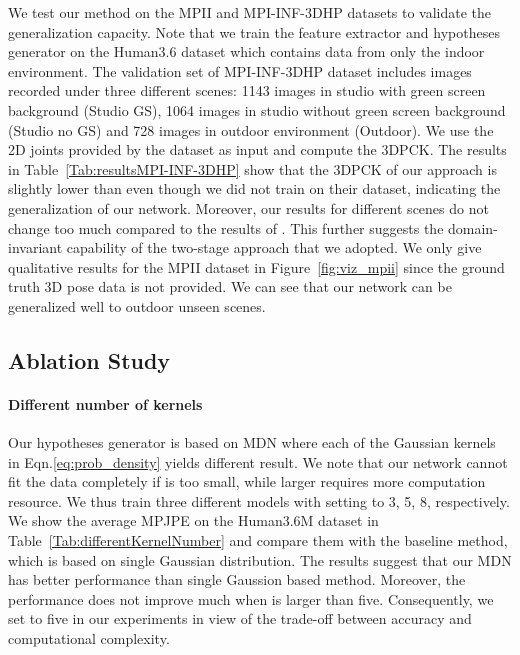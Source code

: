 \documentclass[10pt,twocolumn,letterpaper]{article}
\begin{document}
We test our method on the MPII and MPI-INF-3DHP datasets to validate the generalization capacity. Note that we train the feature extractor and hypotheses generator on the Human3.6 dataset which contains data from only the indoor environment. The validation set of MPI-INF-3DHP dataset includes images recorded under three different scenes: 1143 images in studio with green screen background (Studio GS), 1064 images in studio without green screen background (Studio no GS) and 728 images in outdoor environment (Outdoor). We use the 2D joints provided by the dataset as input and compute the 3DPCK. The results in Table~\ref{Tab:resultsMPI-INF-3DHP} show that the 3DPCK of our approach is slightly lower than \cite{mehta2017monocular} even though we did not train on their dataset, indicating the generalization of our network. Moreover, our results for different scenes do not change too much compared to the results of \cite{mehta2017monocular}. This further suggests the domain-invariant capability of the two-stage approach that we adopted. We only give qualitative results for the MPII dataset in Figure~\ref{fig:viz_mpii} since the ground truth 3D pose data is not provided. We can see that our network can be generalized well to outdoor unseen scenes.


\subsection{Ablation Study}
\paragraph{Different number of kernels} Our hypotheses generator is based on MDN where each of the  Gaussian kernels in Eqn.\eqref{eq:prob_density} yields different result. We note that our network cannot fit the data completely if  is too small, while larger  requires more computation resource. We thus train three different models with  setting to 3, 5, 8, respectively. We show the average MPJPE on the Human3.6M dataset in Table~\ref{Tab:differentKernelNumber} and compare them with the baseline method, which is based on single Gaussian distribution. The results suggest that our MDN has better performance than single Gaussion based method. Moreover, the performance does not improve much when  is larger than five. Consequently, we set  to five in our experiments in view of the trade-off between accuracy and computational complexity.
\vspace{-2mm}
\end{document}
